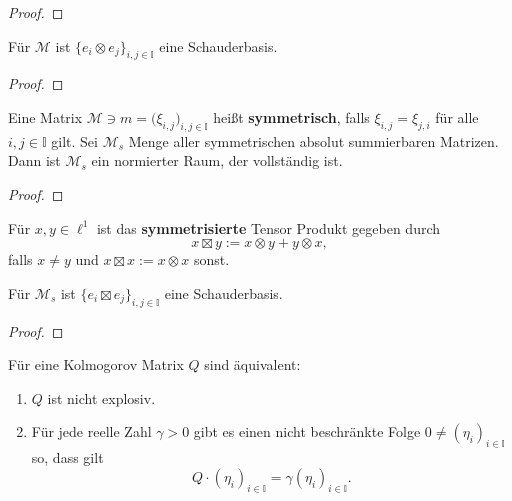 \begin{proof}
   
\end{proof}

\begin{satz}
  Für $\mathcal M$ ist $\{ e_i\otimes e_j\}_{i,j\in \mathbb I}$ eine Schauderbasis.
\end{satz}

\begin{proof}
   
\end{proof}


\begin{konstr}
  Eine Matrix $\mathcal M\ni m=\big(\xi_{i,j}\big)_{i,j\in\mathbb I}$ heißt \textbf{symmetrisch}, falls $\xi_{i,j}=\xi_{j,i}$ für alle $i,j\in\mathbb I$ gilt. Sei $\mathcal M_s$ Menge aller symmetrischen absolut summierbaren Matrizen. Dann ist $\mathcal M_s$ ein  normierter Raum, der vollständig ist.
\end{konstr}

\begin{proof}
   
\end{proof}

\begin{defi}
  Für $x,y\in\ell^1$ ist das \textbf{symmetrisierte} Tensor Produkt  gegeben durch $$x\boxtimes y:=x\otimes y + y\otimes x,$$ falls $x\neq y$ und $x\boxtimes x:=x\otimes x$ sonst.
\end{defi}

\begin{prop}
  Für $\mathcal M_s$ ist $\{e_i\boxtimes e_j\}_{i,j\in\mathbb I}$ eine Schauderbasis.
\end{prop}

\begin{proof}
   
\end{proof}





\begin{prop}
  Für eine Kolmogorov Matrix $Q$ sind äquivalent:
  \begin{enumerate}
      \item $Q$ ist nicht explosiv.
      \item Für jede reelle Zahl $\gamma>0$ gibt es einen nicht beschränkte Folge $0\neq(\eta_i)_{i\in\mathbb I}$ so, dass gilt $$Q\cdot(\eta_i)_{i\in\mathbb I}=\gamma (\eta_i)_{i\in\mathbb I}.$$
  \end{enumerate}
\end{prop}



